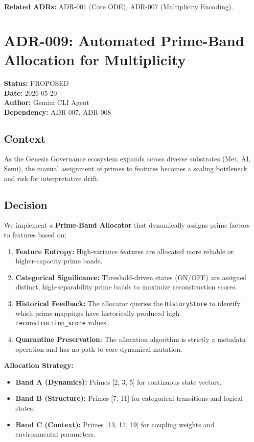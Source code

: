 \documentclass[11pt]{article}
\begin{document}
\textbf{Related ADRs:} ADR-001 (Core ODE), ADR-007 (Multiplicity Encoding).

\section{ADR-009: Automated Prime-Band Allocation for Multiplicity}
\textbf{Status:} PROPOSED \\
\textbf{Date:} 2026-05-20 \\
\textbf{Author:} Gemini CLI Agent \\
\textbf{Dependency:} ADR-007, ADR-008

\subsection{Context}
As the Genesis Governance ecosystem expands across diverse substrates (Met, AI, Semi), the manual assignment of primes to features becomes a scaling bottleneck and risk for interpretative drift.

\subsection{Decision}
We implement a \textbf{Prime-Band Allocator} that dynamically assigns prime factors to features based on:

\begin{enumerate}
    \item \textbf{Feature Entropy:} High-variance features are allocated more reliable or higher-capacity prime bands.
    \item \textbf{Categorical Significance:} Threshold-driven states (ON/OFF) are assigned distinct, high-separability prime bands to maximize reconstruction scores.
    \item \textbf{Historical Feedback:} The allocator queries the \texttt{HistoryStore} to identify which prime mappings have historically produced high \texttt{reconstruction\_score} values.
    \item \textbf{Quarantine Preservation:} The allocation algorithm is strictly a metadata operation and has no path to core dynamical mutation.
\end{enumerate}

\textbf{Allocation Strategy:}
\begin{itemize}
    \item \textbf{Band A (Dynamics):} Primes [2, 3, 5] for continuous state vectors.
    \item \textbf{Band B (Structure):} Primes [7, 11] for categorical transitions and logical states.
    \item \textbf{Band C (Context):} Primes [13, 17, 19] for coupling weights and environmental parameters.
\end{itemize}
\end{document}
